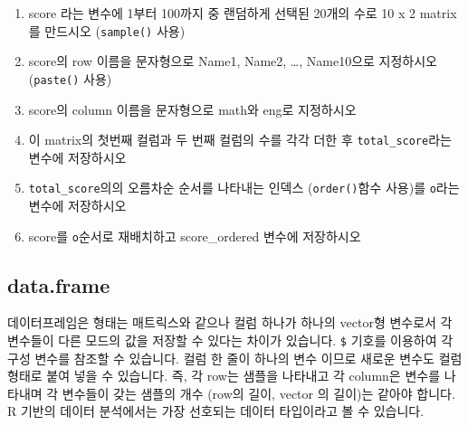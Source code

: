 \documentclass[
  a4paper,
]{book}
\newenvironment{Shaded}{\begin{snugshade}}{\end{snugshade}}
\newcommand{\AttributeTok}[1]{\textcolor[rgb]{0.40,0.45,0.13}{#1}}
\newcommand{\DecValTok}[1]{\textcolor[rgb]{0.68,0.00,0.00}{#1}}
\newcommand{\DocumentationTok}[1]{\textcolor[rgb]{0.37,0.37,0.37}{\textit{#1}}}
\newcommand{\FunctionTok}[1]{\textcolor[rgb]{0.28,0.35,0.67}{#1}}
\newcommand{\NormalTok}[1]{\textcolor[rgb]{0.00,0.23,0.31}{#1}}
\newcommand{\OtherTok}[1]{\textcolor[rgb]{0.00,0.23,0.31}{#1}}
\newcommand{\SpecialCharTok}[1]{\textcolor[rgb]{0.37,0.37,0.37}{#1}}
\newcommand{\StringTok}[1]{\textcolor[rgb]{0.13,0.47,0.30}{#1}}
\begin{document}
\begin{enumerate}
\def\labelenumi{\arabic{enumi})}
\item
  score 라는 변수에 1부터 100까지 중 랜덤하게 선택된 20개의 수로 10 x 2
  matrix를 만드시오 (\texttt{sample()} 사용)
\item
  score의 row 이름을 문자형으로 Name1, Name2, \ldots, Name10으로
  지정하시오 (\texttt{paste()} 사용)
\item
  score의 column 이름을 문자형으로 math와 eng로 지정하시오
\item
  이 matrix의 첫번째 컬럼과 두 번째 컬럼의 수를 각각 더한 후
  \texttt{total\_score}라는 변수에 저장하시오
\item
  \texttt{total\_score}의의 오름차순 순서를 나타내는 인덱스
  (\texttt{order()}함수 사용)를 \texttt{o}라는 변수에 저장하시오
\item
  score를 \texttt{o}순서로 재배치하고 score\_ordered 변수에 저장하시오
\end{enumerate}

\hypertarget{data.frame}{%
\subsection{data.frame}\label{data.frame}}

데이터프레임은 형태는 매트릭스와 같으나 컬럼 하나가 하나의 vector형
변수로서 각 변수들이 다른 모드의 값을 저장할 수 있다는 차이가 있습니다.
\texttt{\$} 기호를 이용하여 각 구성 변수를 참조할 수 있습니다. 컬럼 한
줄이 하나의 변수 이므로 새로운 변수도 컬럼 형태로 붙여 넣을 수 있습니다.
즉, 각 row는 샘플을 나타내고 각 column은 변수를 나타내며 각 변수들이
갖는 샘플의 개수 (row의 길이, vector 의 길이)는 같아야 합니다. R 기반의
데이터 분석에서는 가장 선호되는 데이터 타입이라고 볼 수 있습니다.

\begin{Shaded}
\end{Shaded}
\end{document}
